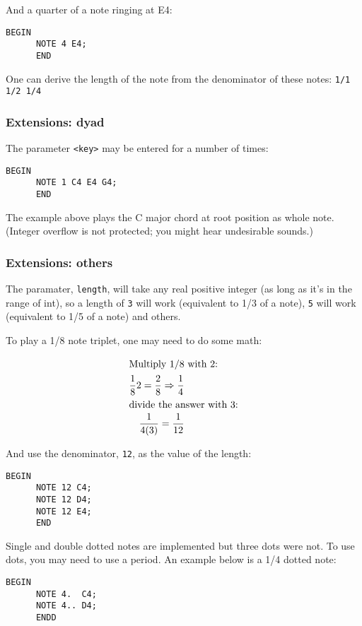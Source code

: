 \documentclass{article}
\begin{document}
And a quarter of a note ringing at E4:
\begin{Verbatim}[frame=single]
      BEGIN
      NOTE 4 E4;
      END
\end{Verbatim}

One can derive the length of the note from the denominator of these notes:
\verb+1/1 1/2 1/4+

\subsubsection{Extensions: dyad}
The parameter \verb+<key>+ may be entered for a number of times:
\begin{Verbatim}[frame=single]
      BEGIN
      NOTE 1 C4 E4 G4;
      END
\end{Verbatim}

The example above plays the C major chord at root position as whole note. (Integer overflow is not
protected; you might hear undesirable sounds.)

\subsubsection{Extensions: others}
The paramater, \verb+length+, will take any real positive integer (as long as it's in the range of int),
so a length of \verb+3+ will work (equivalent to 1/3 of a note), \verb+5+ will work (equivalent to 1/5
of a note) and others. \newline

To play a 1/8 note triplet, one may need to do some math:

\begin{align}
	\shortintertext{Multiply 1/8 with 2:}
	\frac{1}{8}2 = \frac{2}{8} \Rightarrow \frac{1}{4} \\
	\shortintertext{divide the answer with 3:}
	\frac{1}{4(3)} = \frac{1}{12}
\end{align}

And use the denominator, \verb+12+, as the value of the length:
\begin{Verbatim}[frame=single]
      BEGIN
      NOTE 12 C4;
      NOTE 12 D4;
      NOTE 12 E4;
      END
\end{Verbatim}

Single and double dotted notes are implemented but three dots were not. To use dots, you may need to use a period. An example below is a 1/4 dotted note:
\begin{Verbatim}[frame=single]
      BEGIN
      NOTE 4.  C4;
      NOTE 4.. D4;
      ENDD
\end{Verbatim}
\end{document}
